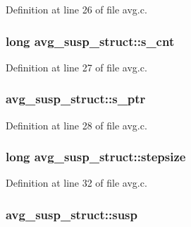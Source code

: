 Definition at line 26 of file avg.\+c.

\subsubsection[{\texorpdfstring{s\+\_\+cnt}{s_cnt}}]{\setlength{\rightskip}{0pt plus 5cm}long avg\+\_\+susp\+\_\+struct\+::s\+\_\+cnt}\hypertarget{structavg__susp__struct_a7cd4b4430159354ea082a6782e94fbf6}{}\label{structavg__susp__struct_a7cd4b4430159354ea082a6782e94fbf6}


Definition at line 27 of file avg.\+c.

\subsubsection[{\texorpdfstring{s\+\_\+ptr}{s_ptr}}]{ avg\+\_\+susp\+\_\+struct\+::s\+\_\+ptr}\hypertarget{structavg__susp__struct_acc41ee9e062771780005352ec38f873e}{}\label{structavg__susp__struct_acc41ee9e062771780005352ec38f873e}


Definition at line 28 of file avg.\+c.

\subsubsection[{\texorpdfstring{stepsize}{stepsize}}]{\setlength{\rightskip}{0pt plus 5cm}long avg\+\_\+susp\+\_\+struct\+::stepsize}\hypertarget{structavg__susp__struct_a6b8813ba1ed16caa28902e7cebfcf475}{}\label{structavg__susp__struct_a6b8813ba1ed16caa28902e7cebfcf475}


Definition at line 32 of file avg.\+c.

\subsubsection[{\texorpdfstring{susp}{susp}}]{ avg\+\_\+susp\+\_\+struct\+::susp}\hypertarget{structavg__susp__struct_a5b39c04319ca52603e77e0553371e998}{}\label{structavg__susp__struct_a5b39c04319ca52603e77e0553371e998}


